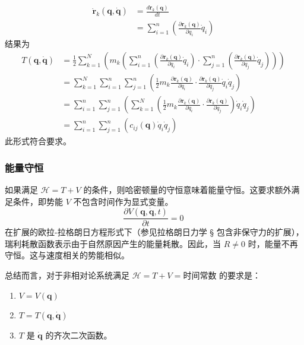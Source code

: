 \begin{equation}
\begin{aligned}
\dot{\mathbf{r}}_k(\boldsymbol{q}, \boldsymbol{\dot{q}}) &= \frac{d\mathbf{r}_k(\boldsymbol{q})}{dt}\\ 
&= \sum_{i=1}^{n} \left( \frac{\partial \mathbf{r}_k(\boldsymbol{q})}{\partial q_i} \dot{q}_i \right)
\end{aligned}~
\end{equation}
结果为
\begin{equation}
\begin{aligned}
T(\boldsymbol{q}, \boldsymbol{\dot{q}}) &= \frac{1}{2} \sum_{k=1}^{N} \left( m_k \left( \sum_{i=1}^{n} \left( \frac{\partial \mathbf{r}_k(\boldsymbol{q})}{\partial q_i} \dot{q}_i \right) \cdot \sum_{j=1}^{n} \left( \frac{\partial \mathbf{r}_k(\boldsymbol{q})}{\partial q_j} \dot{q}_j \right) \right) \right)\\
&= \sum_{k=1}^{N} \sum_{i=1}^{n} \sum_{j=1}^{n} \left( \frac{1}{2} m_k \frac{\partial \mathbf{r}_k(\boldsymbol{q})}{\partial q_i} \cdot \frac{\partial \mathbf{r}_k(\boldsymbol{q})}{\partial q_j} \dot{q}_i \dot{q}_j \right)\\
&= \sum_{i=1}^{n} \sum_{j=1}^{n} \left( \sum_{k=1}^{N} \left( \frac{1}{2} m_k \frac{\partial \mathbf{r}_k(\boldsymbol{q})}{\partial q_i} \cdot \frac{\partial \mathbf{r}_k(\boldsymbol{q})}{\partial q_j} \right) \dot{q}_i \dot{q}_j \right)\\
&= \sum_{i=1}^{n} \sum_{j=1}^{n} \left( c_{ij}(\boldsymbol{q}) \dot{q}_i \dot{q}_j \right)
\end{aligned}~
\end{equation} 
此形式符合要求。 
\subsubsection{能量守恒}
如果满足 \( \mathcal{H} = T + V \) 的条件，则哈密顿量的守恒意味着能量守恒。这要求额外满足条件，即势能 \( V \) 不包含时间作为显式变量。
\[
\frac{\partial V(\boldsymbol{q}, \boldsymbol{\dot{q}}, t)}{\partial t} = 0~
\]
在扩展的欧拉-拉格朗日方程形式下（参见拉格朗日力学 § 包含非保守力的扩展），瑞利耗散函数表示由于自然原因产生的能量耗散。因此，当 \( R \neq 0 \) 时，能量不再守恒。这与速度相关的势能相似。

总结而言，对于非相对论系统满足 \( \mathcal{H} = T + V = \text{时间常数} \) 的要求是：
\begin{enumerate}
\item \( V = V(\boldsymbol{q}) \)
\item \( T = T(\boldsymbol{q}, \boldsymbol{\dot{q}}) \)
\item \( T \) 是 \( \boldsymbol{\dot{q}} \) 的齐次二次函数。
\end{enumerate}
